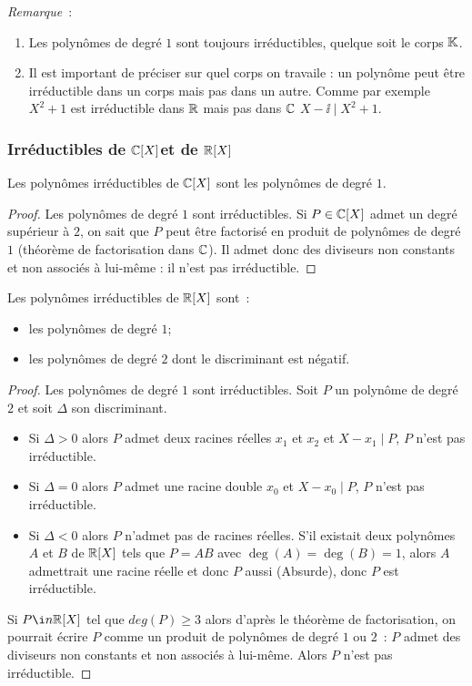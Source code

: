 \emph{Remarque}~:
\begin{enumerate}
\item Les polynômes de degré $1$ sont toujours irréductibles, quelque soit le corps $\mathbb{K}$.
\item Il est important de préciser sur quel corps on travaile : un polynôme peut être irréductible dans un corps mais pas dans un autre. Comme par exemple $X^2+1$ est irréductible dans $\mathbb{R}$ mais pas dans $\mathbb{C}$ $X-\ii\mid{}X^2+1$.
\end{enumerate}

\subsubsection{Irréductibles de $\mathbb{C}[X]$et de $\mathbb{R}[X]$}

\begin{prop}
  Les polynômes irréductibles de $\mathbb{C}[X]$ sont les polynômes de degré $1$.
\end{prop}
\begin{proof}
  Les polynômes de degré $1$ sont irréductibles. Si $P\in \mathbb{C}[X]$ admet un degré supérieur à $2$, on sait que $P$ peut être factorisé en produit de polynômes de degré $1$ (théorème de factorisation dans $\mathbb{C}$). Il admet donc des diviseurs non constants et non associés à lui-même : il n'est pas irréductible.
\end{proof}

\begin{prop}
  Les polynômes irréductibles de $\mathbb{R}[X]$ sont~:
  \begin{itemize}
  \item les polynômes de degré $1$;
  \item les polynômes de degré $2$ dont le discriminant est négatif.
  \end{itemize}
\end{prop}
\begin{proof}
  Les polynômes de degré $1$ sont irréductibles. Soit $P$ un polynôme de degré $2$ et soit $\Delta$ son discriminant.
  \begin{itemize}
  \item Si $\Delta>0$ alors $P$ admet deux racines réelles $x_1$ et $x_2$ et $X-x_1\mid{}P$, $P$ n'est pas irréductible.
  \item Si $\Delta=0$ alors $P$ admet une racine double $x_0$ et $X-x_0\mid{}P$, $P$ n'est pas irréductible.
  \item Si $\Delta <0$ alors $P$ n'admet pas de racines réelles. S'il existait deux polynômes $A$ et $B$ de $\mathbb{R}[X]$ tels que $P=AB$ avec $\deg(A) = \deg(B)=1$, alors $A$ admettrait une racine réelle et donc $P$ aussi (Absurde), donc $P$ est irréductible.
  \end{itemize}
  Si $P \i n \R[X]$ tel que $deg(P)\geq 3$ alors d'après le théorème de factorisation, on pourrait écrire $P$ comme un produit de polynômes de degré $1$ ou $2$~: $P$ admet des diviseurs non constants et non associés à lui-même. Alors $P$ n'est pas irréductible.
\end{proof}

